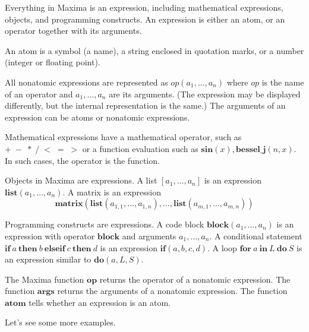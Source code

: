 \documentclass[12pt,leqno]{article}
\begin{document}
Everything in Maxima is an expression,
including mathematical expressions, objects, and programming constructs.
An expression is either an atom, or an operator together with its arguments.

An atom is a symbol (a name), a string enclosed in quotation marks,
or a number (integer or floating point).

All nonatomic expressions are represented as $\mathit{op}(a_1, \ldots, a_n)$
where $\mathit{op}$ is the name of an operator
and $a_1, \ldots, a_n$ are its arguments.
(The expression may be displayed differently,
but the internal representation is the same.)
The arguments of an expression can be atoms or nonatomic expressions.

Mathematical expressions have a mathematical operator,
such as $+ \; - \; * \; / \; < \; = \; >$
or a function evaluation such as $\mathbf{sin}(x), \mathbf{bessel\_j}(n, x)$.
In such cases, the operator is the function.

Objects in Maxima are expressions.
A list $[a_1, \ldots, a_n]$ is an expression $\mathbf{list}(a_1, \ldots, a_n)$.
A matrix is an expression
\[
\mathbf{matrix}(\mathbf{list}(a_{1,1}, \ldots, a_{1,n}), \ldots, \mathbf{list}(a_{m,1}, \ldots, a_{m,n}))
\]

Programming constructs are expressions.
A code block $\mathbf{block} (a_1, \ldots, a_n)$ is an expression with operator $\mathbf{block}$
and arguments $a_1, \ldots, a_n$.
A conditional statement $\mathbf{if\ } a \mathbf{\ then\ } b \mathbf{\ elseif\ } c \mathbf{\ then\ } d$
is an expression $\mathbf{if}(a, b, c, d)$.
A loop $\mathbf{for\ } a \mathbf{\ in\ } L \mathbf{\ do\ } S$ is an expression similar to $\mathbf{do}(a, L, S)$.

The Maxima function $\mathbf{op}$ returns the operator of a nonatomic expression.
The function $\mathbf{args}$ returns the arguments of a nonatomic expression.
The function $\mathbf{atom}$ tells whether an expression is an atom.

Let's see some more examples.
\end{document}
